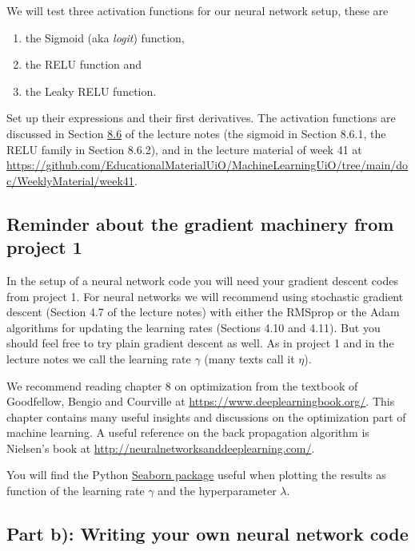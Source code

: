 \documentclass[11pt,a4paper]{article}
\begin{document}
We will test three activation functions for our neural network setup, these
are
\begin{enumerate}[nosep]
  \item the Sigmoid (aka \emph{logit}) function,
  \item the RELU function and
  \item the Leaky RELU function.
\end{enumerate}
Set up their expressions and their first derivatives.  The activation
functions are discussed in Section
\href{https://educationalmaterialuio.github.io/MachineLearningUiO/doc/LectureNotes/_build/html/chapter8.html#activation-functions}{8.6}
of the lecture notes (the sigmoid in Section 8.6.1, the RELU family in
Section 8.6.2), and in the lecture material of week 41 at
\url{https://github.com/EducationalMaterialUiO/MachineLearningUiO/tree/main/doc/WeeklyMaterial/week41}.

\subsection*{Reminder about the gradient machinery from project 1}

In the setup of a neural network code you will need your gradient descent
codes from project 1.  For neural networks we will recommend using
stochastic gradient descent (Section 4.7 of the lecture notes) with either
the RMSprop or the Adam algorithms for updating the learning rates (Sections
4.10 and 4.11).  But you should feel free to try plain gradient descent as
well.  As in project 1 and in the lecture notes we call the learning rate
$\gamma$ (many texts call it $\eta$).

We recommend reading chapter 8 on optimization from the textbook of
Goodfellow, Bengio and Courville at \url{https://www.deeplearningbook.org/}.
This chapter contains many useful insights and discussions on the
optimization part of machine learning.  A useful reference on the back
propagation algorithm is Nielsen's book at
\url{http://neuralnetworksanddeeplearning.com/}.

You will find the Python
\href{https://seaborn.pydata.org/generated/seaborn.heatmap.html}{Seaborn
package} useful when plotting the results as function of the learning rate
$\gamma$ and the hyperparameter $\lambda$.

\subsection*{Part b): Writing your own neural network code}
\end{document}
